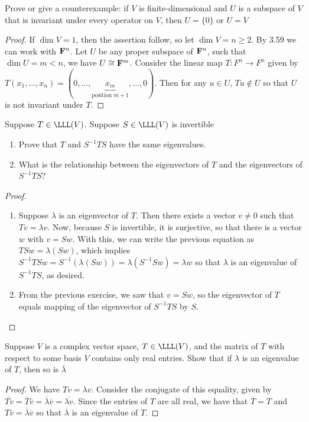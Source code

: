 \begin{exercise}{6}
  Prove or give a counterexample: if $V$ is finite-dimensional and $U$ is a subspace of $V$ that is invariant under every operator on $V$, then $U=\{0\}$ or $U=V$
\end{exercise}
\begin{proof}
 If $\dim V=1$, then the assertion follow, so let $\dim V=n\geq 2$. By 3.59 we can work with $\mathbf{F}^n$. Let $U$ be any proper subspace of $\mathbf{F}^n$, such that $\dim U=m<n$, we have $U\cong\mathbf{F}^m$. Consider the linear map $T:F^n\rightarrow F^n$ given by $T(x_1,\dots,x_n)=(0,\dots,\underbrace{x_m}_{\text{position $m+1$}},\dots,0)$. Then for any $u\in U$, $Tu\notin U$ so that $U$ is not invariant under $T$.
\end{proof}

\begin{exercise}{15}
  Suppose $T\in\LLL(V)$. Suppose $S\in\LLL(V)$ is invertible
  \begin{enumerate}
      \item Prove that $T$ and $S^{-1}TS$ have the same eigenvalues.
      \item What is the relationship between the eigenvectors of $T$ and the eigenvectors of $S^{-1}TS$?
  \end{enumerate}
\end{exercise}
\begin{proof}
\begin{enumerate}
    \item Suppose $\lambda$ is an eigenvector of $T$. Then there exists a vector $v\neq 0$ such that $Tv=\lambda v$. Now, because $S$ is invertible, it is surjective, so that there is a vector $w$ with $v=Sw$. With this, we can write the previous equation as $TSw=\lambda(Sw)$, which implies $S^{-1}TSw=S^{-1}(\lambda(Sw))=\lambda (S^{-1}Sw)=\lambda w$ so that $\lambda$ is an eigenvalue of $S^{-1}TS$, as desired.
    \item From the previous exercise, we saw that $v=Sw$, so the eigenvector of $T$ equals mapping of the eigenvector of $S^{-1}TS$ by $S$.
\end{enumerate}
\end{proof}

\begin{exercise}{16}
  Suppose $V$ is a complex vector space, $T\in\LLL(V)$, and the matrix of $T$ with respect to some basis $V$ contains only real entries. Show that if $\lambda$ is an eigenvalue of $T$, then so is $\bar{\lambda}$
\end{exercise}
\begin{proof}
 We have $Tv=\lambda v$. Consider the conjugate of this equality, given by $\overline{Tv}=\overline{T}\overline{v}=\overline{\lambda}\overline{v}=\overline{\lambda v}$. Since the entries of $T$ are all real, we have that $\overline{T}=T$ and $T\overline{v}=\overline{\lambda}\overline{v}$ so that $\overline{\lambda}$ is an eigenvalue of $T$.
\end{proof}

